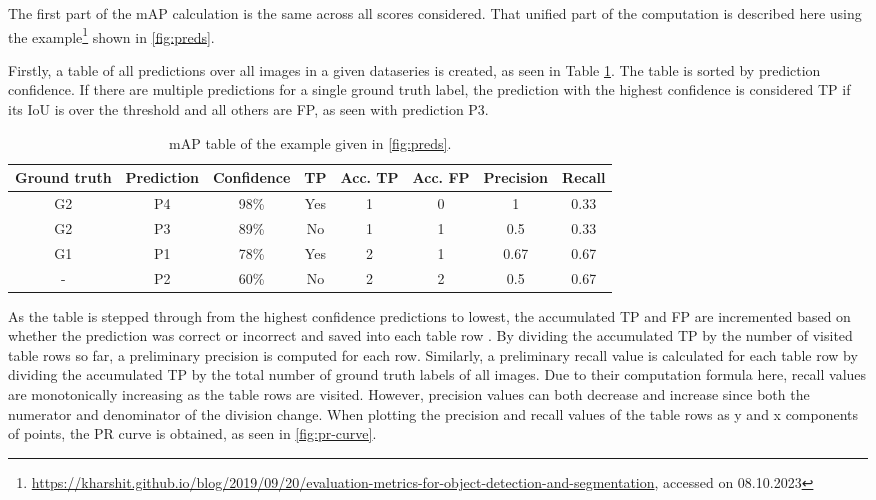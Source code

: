 \documentclass[10pt]{book}
\newcommand{\figureref}[1]{\autoref{#1}}
\begin{document}
The first part of the \ac{mAP} calculation is the same across all scores considered. That unified part of the computation is described here using the example\footnote{\url{https://kharshit.github.io/blog/2019/09/20/evaluation-metrics-for-object-detection-and-segmentation}, accessed on 08.10.2023} shown in \figureref{fig:preds}. 

Firstly, a table of all predictions over all images in a given dataseries is created, as seen in Table \ref{tab:mAP}. The table is sorted by prediction confidence. If there are multiple predictions for a single ground truth label, the prediction with the highest confidence is considered TP if its \ac{IoU} is over the threshold and all others are FP, as seen with prediction P3.

\begin{table}
  \begin{tabular}{ c c c c c c c c }
   Ground truth & Prediction & Confidence & TP & Acc. TP & Acc. FP & Precision & Recall \\ 
   \hline
   G2 & P4 & 98\% & Yes & 1 & 0 & 1 & 0.33 \\
   G2 & P3 & 89\% & No & 1 & 1 & 0.5 & 0.33 \\
   G1 & P1 & 78\% & Yes & 2 & 1 & 0.67 & 0.67 \\
   - & P2 & 60\% & No & 2 & 2 & 0.5 & 0.67 \\
   \hline
  \end{tabular}
  \caption{\label{tab:mAP}\ac{mAP} table of the example given in \figureref{fig:preds}.}
\end{table}

As the table is stepped through from the highest confidence predictions to lowest, the accumulated \ac{TP} and \ac{FP} are incremented based on whether the prediction was correct or incorrect and saved into each table row \cite{padilla2020survey}. By dividing the accumulated \ac{TP} by the number of visited table rows so far, a preliminary precision is computed for each row. Similarly, a preliminary recall value is calculated for each table row by dividing the accumulated \ac{TP} by the total number of ground truth labels of all images. Due to their computation formula here, recall values are monotonically increasing as the table rows are visited. However, precision values can both decrease and increase since both the numerator and denominator of the division change. When plotting the precision and recall values of the table rows as y and x components of points, the \ac{PR curve} is obtained, as seen in \figureref{fig:pr-curve}.
\end{document}
